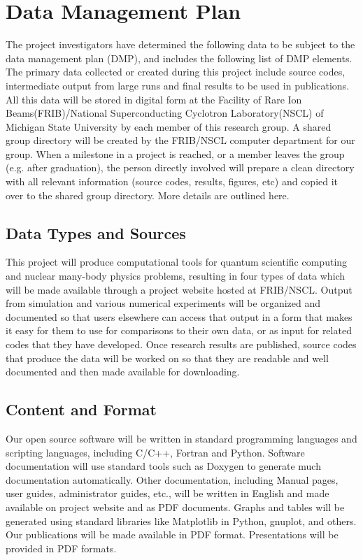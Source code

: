 \documentclass[11pt]{article}
\begin{document}
\section{Data Management Plan}
The project investigators  have determined the following data to be subject to the data management plan
(DMP), and includes the following list of DMP elements.
The primary data collected or created during this project include source codes, intermediate output from large runs and final results to
be used in publications. All this data will be stored in digital form
at the Facility of Rare Ion Beams(FRIB)/National Superconducting
Cyclotron Laboratory(NSCL) of Michigan State University by each member of this research group.  A shared
group directory will be created by the FRIB/NSCL computer department for
our group. When a milestone in a project is reached, or a member
leaves the group (e.g. after graduation), the person directly involved
will prepare a clean directory with all relevant information (source
codes, results, figures, etc) and copied it over to the shared group
directory. More details are outlined here.
 



\subsection{Data Types and Sources}
This project will produce computational tools for quantum scientific computing and nuclear many-body physics problems, resulting in four
types of data which will be made available through a project website hosted at FRIB/NSCL. Output from
simulation and various numerical experiments will be organized and documented so that users elsewhere can access
that output in a form that makes it easy for them to use for comparisons to their own data, or as
input for related codes that they have developed. Once research results are published, source codes
that produce the data will be worked on so that they are readable and well documented and then
made available for downloading.
\subsection{Content and Format}
Our open source software will be written in standard programming languages and scripting languages,
including C/C++, Fortran and Python. Software documentation will use standard
tools such as Doxygen to generate much documentation automatically. Other
documentation, including Manual pages, user guides, administrator guides, etc., will be written in
English and made available on project website and as PDF documents. Graphs and tables will be
generated using standard libraries like Matplotlib in Python, gnuplot, and others. Our publications will be made
available in PDF format. Presentations will be provided in PDF formats.
\end{document}

